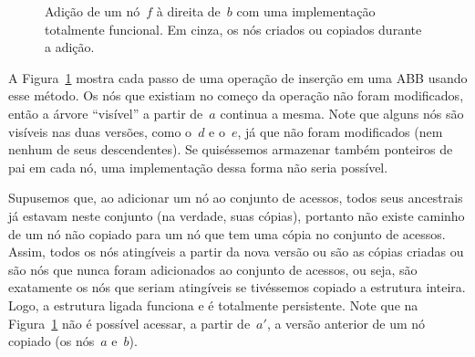 \documentclass[../../main.tex]{subfiles}
\begin{document}
\begin{figure}
	\centering
	\caption{Adição de um nó~$f$ à direita de~$b$ com uma implementação totalmente funcional. Em cinza, os nós criados ou copiados durante a adição.} \label{fig:totfunc_ex}
\end{figure}

A Figura~\ref{fig:totfunc_ex} mostra cada passo de uma operação de inserção em uma ABB usando esse método. Os nós que existiam no começo da operação não foram modificados, então a árvore ``visível'' a partir de~$a$ continua a mesma. Note que alguns nós são visíveis nas duas versões, como o~$d$ e o~$e$, já que não foram modificados (nem nenhum de seus descendentes). Se quiséssemos armazenar também ponteiros de pai em cada nó, uma implementação dessa forma não seria possível.

Supusemos que, ao adicionar um nó ao conjunto de acessos, todos seus ancestrais já estavam neste conjunto (na verdade, suas cópias), portanto não existe caminho de um nó não copiado para um nó que tem uma cópia no conjunto de acessos. Assim, todos os nós atingíveis a partir da nova versão ou são as cópias criadas ou são nós que nunca foram adicionados ao conjunto de acessos, ou seja, são exatamente os nós que seriam atingíveis se tivéssemos copiado a estrutura inteira. Logo, a estrutura ligada funciona e é totalmente persistente. Note que na Figura~\ref{fig:totfunc_ex} não é possível acessar, a partir de~$a'$, a versão anterior de um nó copiado (os nós~$a$ e~$b$).
\end{document}
